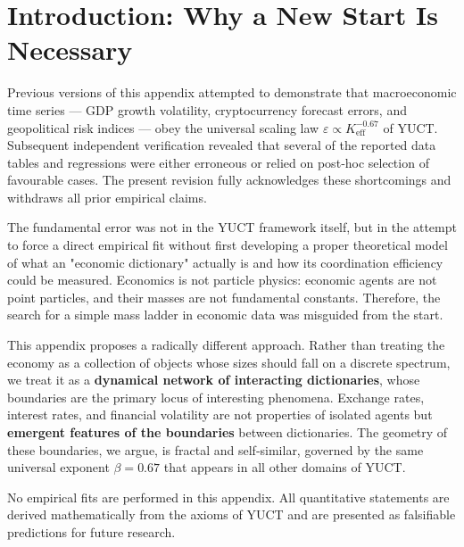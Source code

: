 \documentclass[12pt,a4paper]{article}
\theoremstyle{remark}
\begin{document}
	\tableofcontents
	\newpage
	
	\section{Introduction: Why a New Start Is Necessary}
	
	Previous versions of this appendix attempted to demonstrate that macroeconomic time series — GDP growth volatility, cryptocurrency forecast errors, and geopolitical risk indices — obey the universal scaling law \(\varepsilon \propto K_{\mathrm{eff}}^{-0.67}\) of YUCT. Subsequent independent verification revealed that several of the reported data tables and regressions were either erroneous or relied on post‑hoc selection of favourable cases. The present revision fully acknowledges these shortcomings and withdraws all prior empirical claims.
	
	The fundamental error was not in the YUCT framework itself, but in the attempt to force a direct empirical fit without first developing a proper theoretical model of what an "economic dictionary" actually is and how its coordination efficiency could be measured. Economics is not particle physics: economic agents are not point particles, and their masses are not fundamental constants. Therefore, the search for a simple mass ladder in economic data was misguided from the start.
	
	This appendix proposes a radically different approach. Rather than treating the economy as a collection of objects whose sizes should fall on a discrete spectrum, we treat it as a \textbf{dynamical network of interacting dictionaries}, whose boundaries are the primary locus of interesting phenomena. Exchange rates, interest rates, and financial volatility are not properties of isolated agents but \textbf{emergent features of the boundaries} between dictionaries. The geometry of these boundaries, we argue, is fractal and self‑similar, governed by the same universal exponent \(\beta = 0.67\) that appears in all other domains of YUCT.
	
	No empirical fits are performed in this appendix. All quantitative statements are derived mathematically from the axioms of YUCT and are presented as falsifiable predictions for future research.
	
\end{document}

